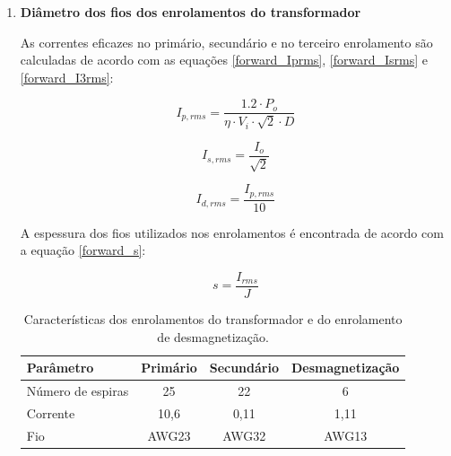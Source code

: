 \begin{apendicesenv}
\begin{enumerate}
\item \textbf{Diâmetro dos fios dos enrolamentos do transformador}
    
As correntes eficazes no primário, secundário e no terceiro enrolamento são calculadas de acordo com as equações \ref{forward_Iprms}, \ref{forward_Isrms} e \ref{forward_I3rms}: 
    
    \begin{equation}
        I_{p,rms} = \frac{1.2 \cdot P_{o}}{\eta \cdot V_{i} \cdot \sqrt{2} \cdot D}
        \label{forward_Isrms}
    \end{equation}

    \begin{equation}
        I_{s,rms} = \frac{I_{o}}{\sqrt{2}}
        \label{forward_Iprms}
    \end{equation}

    \begin{equation}
        I_{d,rms} = \frac{I_{p,rms}}{10}
        \label{forward_I3rms}
    \end{equation}
    
A espessura dos fios utilizados nos enrolamentos é encontrada de acordo com a equação \ref{forward_s}:

    \begin{equation}
        s = \frac{I_{rms}}{J}
        \label{forward_s}
    \end{equation}

\begin{table}[H]
    \centering
    \footnotesize
    \caption{Características dos enrolamentos do transformador e do enrolamento de desmagnetização.}
    \label{Conversor_cc/cc}
    \begin{adjustbox}{max width = \textwidth}
        \begin{tabular}{|l|c|c|c|}
            \hline
            \rowcolor[HTML]{A8DADC}
            Parâmetro & Primário & Secundário & Desmagnetização
            \\ \hline
            Número de espiras & 25 & 22 & 6
            \\ \hline
            Corrente & 10,6 & 0,11 & 1,11
            \\ \hline
            Fio & AWG23 & AWG32 & AWG13
             \\ \hline
        \end{tabular}
    \end{adjustbox}
\end{table}


\end{enumerate}
\end{apendicesenv}
